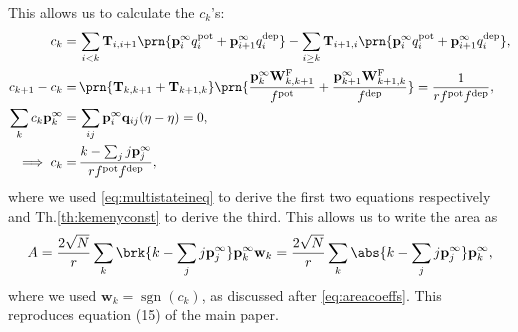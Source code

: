 \documentclass[9pt,twocolumn,twoside,lineno]{pnas-new}
\DeclareMathOperator{\sgn}{sgn}
\newcommand{\prob}{\mathbf{p}}
\newcommand{\eq}{\prob^\infty}
\newcommand{\fpt}{\mathbf{T}}
\newcommand{\w}{\mathbf{w}}
\newcommand{\W}{\mathbf{W}}
\newcommand{\enc}{\mathbf{q}}
\newcommand{\frg}{\W^{\mathrm{F}}}
\newcommand{\pot}{^{\text{pot}}}
\newcommand{\dep}{^{\text{dep}}}
\begin{document}
\begin{strip}
This allows us to calculate the $c_k$'s:
%
\begin{equation}\label{eq:areacoeffchain}
\begin{aligned}
  c_k =&\, \sum_{i<k} \fpt_{i,i+1} \prn{\eq_{i}q\pot _i+\eq_{i+1}q\dep _i}
    - \sum_{i\geq k} \fpt_{i+1,i} \prn{\eq_{i}q\pot _i+\eq_{i+1}q\dep _i}
  ,\\
  c_{k+1} - c_k =&\, \prn{\fpt_{k,k+1}+\fpt_{k+1,k}} \prn{\frac{\eq_{k}\frg_{k,k+1}}{f\pot }+\frac{\eq_{k+1}\frg_{k+1,k}}{f\dep }}
    =%
    \frac{1}{rf\pot f\dep },\\
  \sum_k c_k \eq_k =&\, \sum_{ij} \eq_i \enc_{ij} (\eta-\eta) = 0,\\
  \implies c_k =&\, \frac{k - \sum_j j\eq_j}{rf\pot f\dep },
\end{aligned}
\end{equation}
%
where we used \cref{eq:multistateineq} to derive the first two equations respectively and Th.\ref{th:kemenyconst} to derive the third. This allows us to write the area as
%
\begin{equation}\label{eq:multistatearea:s}
  A = \frac{2\sqrt{N}}{r} \sum_k \brk{k - \sum_j j\eq_j} \eq_k \w_k
    = \frac{2\sqrt{N}}{r} \sum_k \abs{k - \sum_j j\eq_j} \eq_k ,
\end{equation}
%
where we used $\w_k=\sgn(c_k)$, as discussed after \cref{eq:areacoeffs}.
This reproduces equation (15) of the main paper.


\end{strip}
\end{document}
